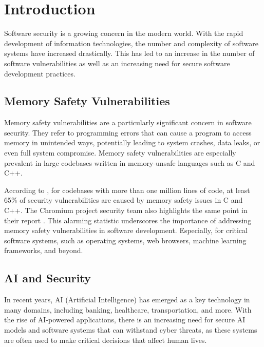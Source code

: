 \section{Introduction}

Software security is a growing concern in the modern world. With the rapid development of information technologies, the number and complexity of software systems have increased drastically. This has led to an increase in the number of software vulnerabilities as well as an increasing need for secure software development practices.

\subsection{Memory Safety Vulnerabilities}

Memory safety vulnerabilities are a particularly significant concern in software security. They refer to programming errors that can cause a program to access memory in unintended ways, potentially leading to system crashes, data leaks, or even full system compromise. Memory safety vulnerabilities are especially prevalent in large codebases written in memory-unsafe languages such as C and C++.

According to \cite{what-science-can-tell-us-about-c-and-c++-security}, for codebases with more than one million lines of code, at least 65\% of security vulnerabilities are caused by memory safety issues in C and C++. The Chromium project security team also highlights the same point in their report \cite{chromium-project-memory-safety}. This alarming statistic underscores the importance of addressing memory safety vulnerabilities in software development. Especially, for critical software systems, such as operating systems, web browsers, machine learning frameworks, and beyond.

\subsection{AI and Security}


In recent years, AI (Artificial Intelligence) has emerged as a key technology in many domains, including banking, healthcare, transportation, and more. With the rise of AI-powered applications, there is an increasing need for secure AI models and software systems that can withstand cyber threats, as these systems are often used to make critical decisions that affect human lives.

